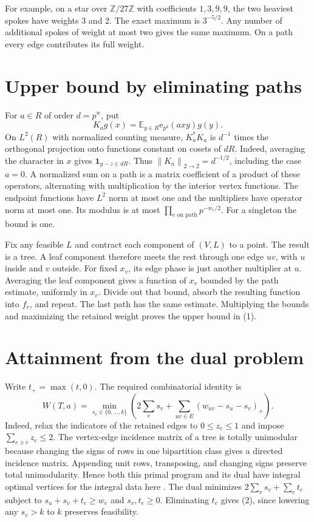 \documentclass[10pt]{article}
\newcommand{\E}{\mathbb E}
\newcommand{\Z}{\mathbb Z}
\newcommand{\ee}{\mathrm e}
\newcommand{\norm}[1]{\left\|#1\right\|}
\begin{document}
For example, on a star over $\Z/27\Z$ with coefficients $1,3,9,9$,
the two heaviest spokes have weights $3$ and $2$. The exact maximum
is $3^{-5/2}$. Any number of additional spokes of weight at most two
gives the same maximum. On a path every edge contributes its full weight.

\section{Upper bound by eliminating paths}
For $a\in R$ of order $d=p^w$, put
\[
 K_a g(x)=\E_{y\in R}\ee_{p^k}(axy)g(y).
\]
On $L^2(R)$ with normalized counting measure, $K_a^*K_a$ is
$d^{-1}$ times the orthogonal projection onto functions constant on
cosets of $dR$. Indeed, averaging the character in $x$ gives
$\mathbf1_{y-z\in dR}$. Thus $\norm{K_a}_{2\to2}=d^{-1/2}$,
including the case $a=0$. A normalized sum on a path is a matrix
coefficient of a product of these operators, alternating with
multiplication by the interior vertex functions. The endpoint functions
have $L^2$ norm at most one and the multipliers have operator norm at
most one. Its modulus is at most $\prod_{e\text{ on path}}p^{-w_e/2}$.
For a singleton the bound is one.

Fix any feasible $L$ and contract each component of $(V,L)$ to a point.
The result is a tree. A leaf component therefore meets the rest through
one edge $uv$, with $u$ inside and $v$ outside. For fixed $x_v$, its
edge phase is just another multiplier at $u$. Averaging the leaf
component gives a function of $x_v$ bounded by the path estimate,
uniformly in $x_v$. Divide out that bound, absorb the resulting function
into $f_v$, and repeat. The last path has the same estimate. Multiplying
the bounds and maximizing the retained weight proves the upper bound
in (1).

\section{Attainment from the dual problem}
Write $t_+=\max(t,0)$. The required combinatorial identity is
\[
 W(T,a)=\min_{s_v\in\{0,\ldots,k\}}
 \left(2\sum_v s_v+\sum_{uv\in E}(w_{uv}-s_u-s_v)_+\right).
 \tag{2}
\]
Indeed, relax the indicators of the retained edges to $0\le z_e\le1$
and impose $\sum_{e\ni v}z_e\le2$. The vertex-edge incidence matrix of
a tree is totally unimodular because changing the signs of rows in one
bipartition class gives a directed incidence matrix. Appending unit
rows, transposing, and changing signs preserve total unimodularity.
Hence both this primal program and its dual have integral optimal
vertices for the integral data here \cite{schrijver}. The dual minimizes
$2\sum_v s_v+\sum_e t_e$ subject to $s_u+s_v+t_e\ge w_e$ and
$s_v,t_e\ge0$. Eliminating $t_e$ gives (2), since lowering any
$s_v>k$ to $k$ preserves feasibility.
\end{document}
